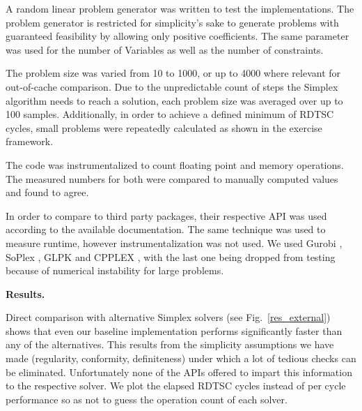 \documentclass[letterpaper]{article}
\newcommand{\mypar}[1]{{\bf #1.}}
\begin{document}
A random linear problem generator was written to test the implementations. 
The problem generator is restricted for simplicity's sake to generate problems with guaranteed feasibility by allowing only positive coefficients. 
The same parameter was used for the number of Variables as well as the number of constraints.

The problem size was varied from 10 to 1000, or up to 4000 where relevant for out-of-cache comparison.
Due to the unpredictable count of steps the Simplex algorithm needs to reach a solution, each problem size was averaged over up to 100 samples.
Additionally, in order to achieve a defined minimum of RDTSC cycles, small problems were repeatedly calculated as shown in the exercise framework.

The code was instrumentalized to count floating point and memory operations. The measured numbers for both were compared to manually computed values and found to agree.

In order to compare to third party packages, their respective API was used according to the available documentation. 
The same technique was used to measure runtime, however instrumentalization was not used.
We used Gurobi \cite{gurobi}, SoPlex \cite{soplex}, GLPK \cite{glpk} and CPPLEX \cite{cpplex}, with the last one being dropped from testing because of numerical instability for large problems.


\mypar{Results}

Direct comparison with alternative Simplex solvers (see Fig.~\ref{res_external}) shows that even our baseline implementation performs significantly faster than any of the alternatives.
This results from the simplicity assumptions we have made (regularity, conformity, definiteness) under which a lot of tedious checks can be eliminated.
Unfortunately none of the APIs offered to impart this information to the respective solver.
We plot the elapsed RDTSC cycles instead of per cycle performance so as not to guess the operation count of each solver.
\end{document}

